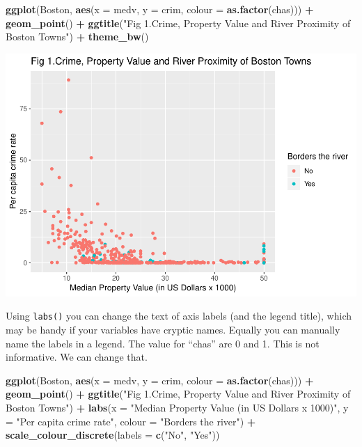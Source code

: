 \documentclass[]{book}
\newenvironment{Shaded}{\begin{snugshade}}{\end{snugshade}}
\newcommand{\DataTypeTok}[1]{\textcolor[rgb]{0.13,0.29,0.53}{#1}}
\newcommand{\KeywordTok}[1]{\textcolor[rgb]{0.13,0.29,0.53}{\textbf{#1}}}
\newcommand{\NormalTok}[1]{#1}
\newcommand{\OperatorTok}[1]{\textcolor[rgb]{0.81,0.36,0.00}{\textbf{#1}}}
\newcommand{\StringTok}[1]{\textcolor[rgb]{0.31,0.60,0.02}{#1}}
\theoremstyle{definition}
\theoremstyle{definition}
\theoremstyle{definition}
\theoremstyle{remark}
\begin{document}
\begin{Shaded}
\begin{Highlighting}[]
\KeywordTok{ggplot}\NormalTok{(Boston, }\KeywordTok{aes}\NormalTok{(}\DataTypeTok{x =}\NormalTok{ medv, }\DataTypeTok{y =}\NormalTok{ crim, }\DataTypeTok{colour =} \KeywordTok{as.factor}\NormalTok{(chas))) }\OperatorTok{+}
\StringTok{  }\KeywordTok{geom_point}\NormalTok{() }\OperatorTok{+}
\StringTok{  }\KeywordTok{ggtitle}\NormalTok{(}\StringTok{"Fig 1.Crime, Property Value and River Proximity of Boston Towns"}\NormalTok{) }\OperatorTok{+}
\StringTok{  }\KeywordTok{theme_bw}\NormalTok{()}
\end{Highlighting}
\end{Shaded}

\includegraphics{03-visualisation_files/figure-latex/unnamed-chunk-56-1.pdf}

Using \texttt{labs()} you can change the text of axis labels (and the
legend title), which may be handy if your variables have cryptic names.
Equally you can manually name the labels in a legend. The value for
``chas'' are 0 and 1. This is not informative. We can change that.

\begin{Shaded}
\begin{Highlighting}[]
\KeywordTok{ggplot}\NormalTok{(Boston, }\KeywordTok{aes}\NormalTok{(}\DataTypeTok{x =}\NormalTok{ medv, }\DataTypeTok{y =}\NormalTok{ crim, }\DataTypeTok{colour =} \KeywordTok{as.factor}\NormalTok{(chas))) }\OperatorTok{+}
\StringTok{  }\KeywordTok{geom_point}\NormalTok{() }\OperatorTok{+}
\StringTok{  }\KeywordTok{ggtitle}\NormalTok{(}\StringTok{"Fig 1.Crime, Property Value and River Proximity of Boston Towns"}\NormalTok{) }\OperatorTok{+}
\StringTok{  }\KeywordTok{labs}\NormalTok{(}\DataTypeTok{x =} \StringTok{"Median Property Value (in US Dollars x 1000)"}\NormalTok{,}
       \DataTypeTok{y =} \StringTok{"Per capita crime rate"}\NormalTok{,}
       \DataTypeTok{colour =} \StringTok{"Borders the river"}\NormalTok{) }\OperatorTok{+}
\StringTok{  }\KeywordTok{scale_colour_discrete}\NormalTok{(}\DataTypeTok{labels =} \KeywordTok{c}\NormalTok{(}\StringTok{"No"}\NormalTok{, }\StringTok{"Yes"}\NormalTok{))}
\end{Highlighting}
\end{Shaded}
\end{document}
